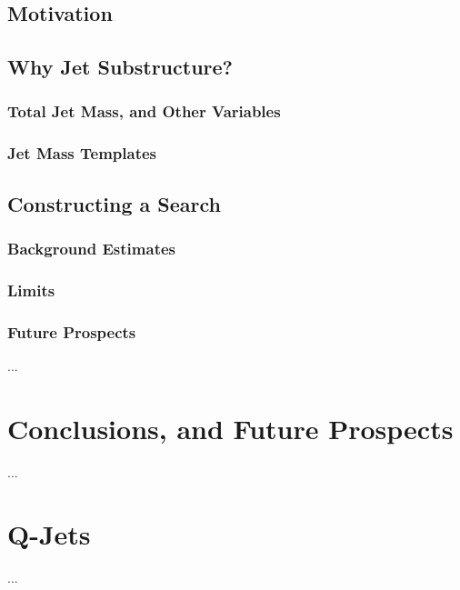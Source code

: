 \documentclass{report}
\begin{document}
\section{Motivation}
\section{Why Jet Substructure?}
	\subsection{Total Jet Mass, and Other Variables}
	\subsection{Jet Mass Templates}
\section{Constructing a Search}
	\subsection{Background Estimates}
	\subsection{Limits}
	\subsection{Future Prospects}
		...


\chapter{Conclusions, and Future Prospects}
         ...
\appendix
\chapter{Q-Jets}
         ...


\end{document}
